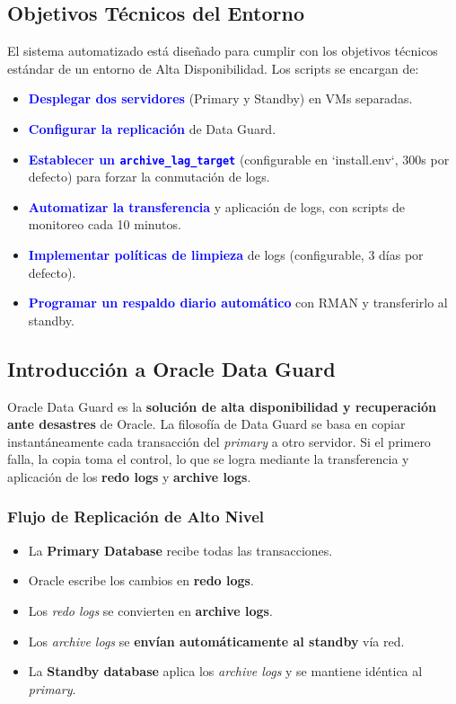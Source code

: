 \documentclass[11pt, a4paper]{report}
\newcommand{\destacado}[1]{\textbf{\textcolor{blue}{#1}}}
\begin{document}
\subsection{Objetivos Técnicos del Entorno}

El sistema automatizado está diseñado para cumplir con los objetivos técnicos estándar de un entorno de Alta Disponibilidad. Los scripts se encargan de:
\begin{itemize}
    \item \destacado{Desplegar dos servidores} (Primary y Standby) en VMs separadas.
    \item \destacado{Configurar la replicación} de Data Guard.
    \item \destacado{Establecer un \texttt{archive\_lag\_target}} (configurable en `install.env`, 300s por defecto) para forzar la conmutación de logs.
    \item \destacado{Automatizar la transferencia} y aplicación de logs, con scripts de monitoreo cada 10 minutos.
    \item \destacado{Implementar políticas de limpieza} de logs (configurable, 3 días por defecto).
    \item \destacado{Programar un respaldo diario automático} con RMAN y transferirlo al standby.
\end{itemize}

\subsection{Introducción a Oracle Data Guard}

Oracle Data Guard es la \textbf{solución de alta disponibilidad y recuperación ante desastres} de Oracle.
La filosofía de Data Guard se basa en copiar instantáneamente cada transacción del \textit{primary} a otro servidor. Si el primero falla, la copia toma el control, lo que se logra mediante la transferencia y aplicación de los \textbf{redo logs} y \textbf{archive logs}.

\subsubsection{Flujo de Replicación de Alto Nivel}

\begin{itemize}
    \item La \textbf{Primary Database} recibe todas las transacciones.
\item Oracle escribe los cambios en \textbf{redo logs}.
    \item Los \textit{redo logs} se convierten en \textbf{archive logs}.
\item Los \textit{archive logs} se \textbf{envían automáticamente al standby} vía red.
\item La \textbf{Standby database} aplica los \textit{archive logs} y se mantiene idéntica al \textit{primary}.
\end{itemize}
\end{document}
